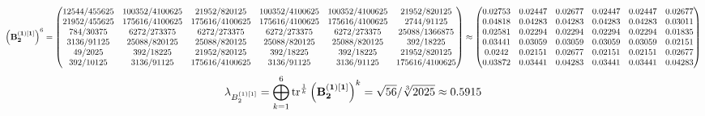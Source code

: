 \documentclass[10pt,a4paper]{article}
\begin{document}
	\[
		\left(\bold{B_2^{(1)[1]}}\right)^{6} = 
		\begin{pmatrix}
			{{12544}} / {{455625}} & {{100352}} / {{4100625}} & {{21952}} / {{820125}} & {{100352}} / {{4100625}} & {{100352}} / {{4100625}} & {{21952}} / {{820125}} \\
			{{21952}} / {{455625}} & {{175616}} / {{4100625}} & {{175616}} / {{4100625}} & {{175616}} / {{4100625}} & {{175616}} / {{4100625}} & {{2744}} / {{91125}} \\
			{{784}} / {{30375}} & {{6272}} / {{273375}} & {{6272}} / {{273375}} & {{6272}} / {{273375}} & {{6272}} / {{273375}} & {{25088}} / {{1366875}} \\
			{{3136}} / {{91125}} & {{25088}} / {{820125}} & {{25088}} / {{820125}} & {{25088}} / {{820125}} & {{25088}} / {{820125}} & {{392}} / {{18225}} \\
			{{49}} / {{2025}} & {{392}} / {{18225}} & {{21952}} / {{820125}} & {{392}} / {{18225}} & {{392}} / {{18225}} & {{21952}} / {{820125}} \\
			{{392}} / {{10125}} & {{3136}} / {{91125}} & {{175616}} / {{4100625}} & {{3136}} / {{91125}} & {{3136}} / {{91125}} & {{175616}} / {{4100625}} \\
		\end{pmatrix}
		\approx
		\begin{pmatrix}
			0.02753  & 0.02447  & 0.02677  & 0.02447  & 0.02447  & 0.02677  \\
			0.04818  & 0.04283  & 0.04283  & 0.04283  & 0.04283  & 0.03011  \\
			0.02581  & 0.02294  & 0.02294  & 0.02294  & 0.02294  & 0.01835  \\
			0.03441  & 0.03059  & 0.03059  & 0.03059  & 0.03059  & 0.02151  \\
			0.0242   & 0.02151  & 0.02677  & 0.02151  & 0.02151  & 0.02677  \\
			0.03872  & 0.03441  & 0.04283  & 0.03441  & 0.03441  & 0.04283  \\
		\end{pmatrix}
	\]
	\[
		\lambda_{B_2^{(1)[1]}} =  \bigoplus ^{6} _{k = 1} \operatorname{tr} ^{\frac 1 k} \left( \bold{B_2^{(1)[1]}} \right)^k = {\sqrt{56}} / {\sqrt[3]{2025}}\approx 0.5915
	\]
\end{document}
